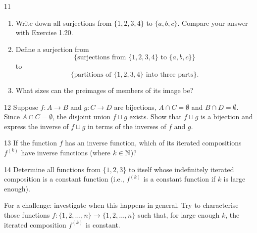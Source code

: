 \documentclass[11pt]{article}
\begin{document}
\begin{exercise}{11}
    \begin{enumerate}[label=(\alph*)]
        \item Write down all surjections from $\{1,2,3,4\}$ to
            $\{a,b,c\}$. Compare your answer with Exercise 1.20.
        \item Define a surjection from
        \[
            \{\text{surjections from } \{1,2,3,4\} \text{ to }
            \{a,b,c\}\}
        \]
        to
        \[
            \{\text{partitions of } \{1,2,3,4\} \text{ into three
            parts}\}.
        \]
        \item What sizes can the preimages of members of its image
            be?
    \end{enumerate}
\end{exercise}
\begin{solution}

\end{solution}

\begin{exercise}{12}
    Suppose $f:A\to B$ and $g:C\to D$ are bijections, $A\cap
    C=\emptyset$ and $B\cap D=\emptyset$. Since $A\cap C=\emptyset$,
    the disjoint union $f\sqcup g$ exists. Show that $f\sqcup g$ is a
    bijection and express the inverse of $f\sqcup g$ in terms of the
    inverses of $f$ and $g$.
\end{exercise}
\begin{solution}

\end{solution}

\begin{exercise}{13}
    If the function $f$ has an inverse function, which of its
    iterated compositions $f^{(k)}$ have inverse functions (where
    $k\in\mathbb{N}$)?
\end{exercise}
\begin{solution}

\end{solution}

\begin{exercise}{14}
    Determine all functions from $\{1,2,3\}$ to itself whose
    indefinitely iterated composition is a constant function (i.e.,
    $f^{(k)}$ is a constant function if $k$ is large enough).

    For a challenge: investigate when this happens in general. Try
    to characterise those functions $f:\{1,2,\dots,n\}\to
    \{1,2,\dots,n\}$ such that, for large enough $k$, the iterated
    composition $f^{(k)}$ is constant.
\end{exercise}
\begin{solution}

\end{solution}
\end{document}
